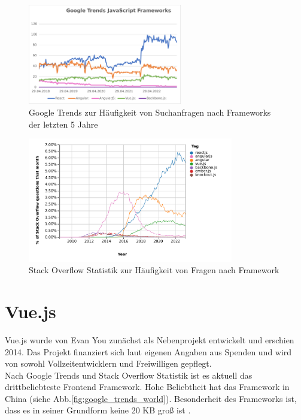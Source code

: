 \begin{figure}[H]
    \centering
    \includegraphics[width=0.6\textwidth]{img/Google Stats/google_frameworks_trends}
    \caption{Google Trends zur Häufigkeit von Suchanfragen nach Frameworks der letzten 5 Jahre \cite{googleTrends}}
    \label{fig:google_trends}
\end{figure}

\begin{figure}[H]
    \centering
    \includegraphics[width=0.8\textwidth]{img/js_frameworks_statistic_stackoverflow}
    \caption{Stack Overflow Statistik zur Häufigkeit von Fragen nach Framework \cite{stackoverflowStats}}
    \label{fig:stackoverflow_stat}
\end{figure}



\section{Vue.js}
Vue.js wurde von Evan You zunächst als Nebenprojekt entwickelt und erschien 2014.
Das Projekt finanziert sich laut eigenen Angaben aus Spenden und
wird von sowohl Vollzeitentwicklern und Freiwilligen gepflegt.  \cite{vueFAQ}
\\
Nach Google Trends  \cite{googleTrends} und Stack Overflow Statistik \cite{stackoverflowStats} ist es aktuell das drittbeliebteste
Frontend Framework.
Hohe Beliebtheit hat das Framework in China (siehe Abb.\ref{fig:google_trends_world}).
Besonderheit des Frameworks ist, dass es in seiner Grundform keine 20 KB groß ist \cite[S. 523]{bin2019}.

